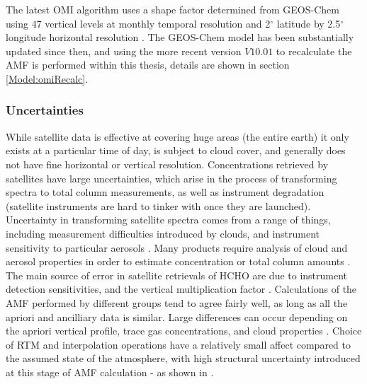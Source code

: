       The latest OMI algorithm uses a shape factor determined from GEOS-Chem using 47 vertical levels at monthly temporal resolution and 2$^{\circ}$ latitude by 2.5$^{\circ}$ longitude horizontal resolution \parencite{Abad2015}.
      The GEOS-Chem model has been substantially updated since then, and using the more recent version $V10.01$ to recalculate the AMF is performed within this thesis, details are shown in section \ref{Model:omiRecalc}.
      
    \subsubsection{Uncertainties}
      While satellite data is effective at covering huge areas (the entire earth) it only exists at a particular time of day, is subject to cloud cover, and generally does not have fine horizontal or vertical resolution.
      Concentrations retrieved by satellites have large uncertainties, which arise in the process of transforming spectra to total column measurements, as well as instrument degradation (satellite instruments are hard to tinker with once they are launched).
      Uncertainty in transforming satellite spectra comes from a range of things, including measurement difficulties introduced by clouds, and instrument sensitivity to particular aerosols \parencite{Millet2006}.
      Many products require analysis of cloud and aerosol properties in order to estimate concentration or total column amounts \parencite{Palmer2001,Palmer2003, Marais2012, Vasilkov2017}.
      The main source of error in satellite retrievals of HCHO are due to instrument detection sensitivities, and the vertical multiplication factor \parencite{Millet2006}.
      Calculations of the AMF performed by different groups tend to agree fairly well, as long as all the apriori and ancilliary data is similar.
      Large differences can occur depending on the apriori vertical profile, trace gas concentrations, and cloud properties \parencite{Lorent2017}.
      Choice of RTM and interpolation operations have a relatively small affect compared to the assumed state of the atmosphere, with high structural uncertainty introduced at this stage of AMF calculation - as shown in \textcite{Lorent2017}.
      
